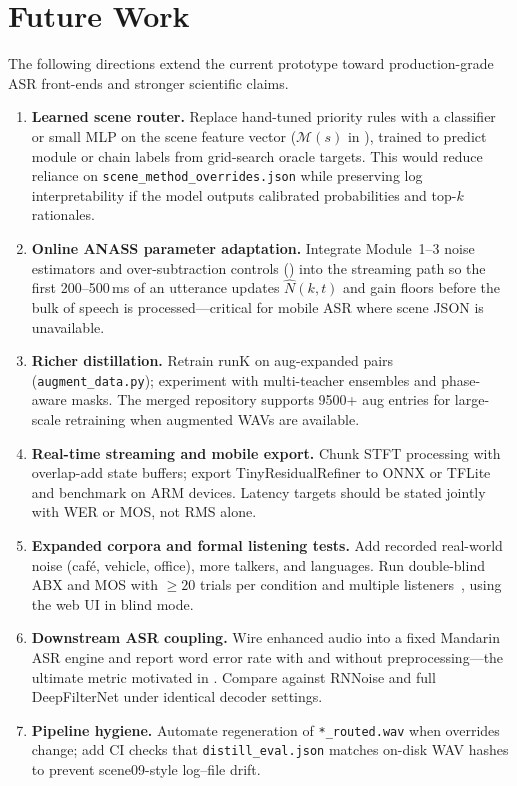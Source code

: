 \section{Future Work}
\label{sec:future}

The following directions extend the current prototype toward production-grade ASR front-ends and stronger scientific claims.

\begin{enumerate}
  \item \textbf{Learned scene router.}
  Replace hand-tuned priority rules with a classifier or small MLP on the scene feature vector ($\mathcal{M}(s)$ in ), trained to predict module or chain labels from grid-search oracle targets. This would reduce reliance on \texttt{scene\_method\_overrides.json} while preserving log interpretability if the model outputs calibrated probabilities and top-$k$ rationales.

  \item \textbf{Online ANASS parameter adaptation.}
  Integrate Module~1--3 noise estimators and over-subtraction controls () into the streaming path so the first 200--500\,ms of an utterance updates $\hat{N}(k,t)$ and gain floors before the bulk of speech is processed---critical for mobile ASR where scene JSON is unavailable.

  \item \textbf{Richer distillation.}
  Retrain runK on aug-expanded pairs (\texttt{augment\_data.py}); experiment with multi-teacher ensembles and phase-aware masks. The merged repository supports 9500+ aug entries for large-scale retraining when augmented WAVs are available.

  \item \textbf{Real-time streaming and mobile export.}
  Chunk STFT processing with overlap-add state buffers; export TinyResidualRefiner to ONNX or TFLite and benchmark on ARM devices. Latency targets should be stated jointly with WER or MOS, not RMS alone.

  \item \textbf{Expanded corpora and formal listening tests.}
  Add recorded real-world noise (café, vehicle, office), more talkers, and languages. Run double-blind ABX and MOS with $\ge 20$ trials per condition and multiple listeners~\cite{loizou2013}, using the web UI in blind mode.

  \item \textbf{Downstream ASR coupling.}
  Wire enhanced audio into a fixed Mandarin ASR engine and report word error rate with and without preprocessing---the ultimate metric motivated in . Compare \projectshort{} against RNNoise and full DeepFilterNet under identical decoder settings.

  \item \textbf{Pipeline hygiene.}
  Automate regeneration of \texttt{*\_routed.wav} when overrides change; add CI checks that \texttt{distill\_eval.json} matches on-disk WAV hashes to prevent scene09-style log--file drift.
\end{enumerate}

